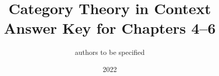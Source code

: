 \documentclass{report}
\begin{document}
\title{Category Theory in Context\\
Answer Key for Chapters 4--6}
\author{authors to be specified}
\date{2022}

\hypersetup{pageanchor=false}  %
\maketitle
\hypersetup{pageanchor=true}

\tableofcontents



\setcounter{chapter}{3}



\end{document}
